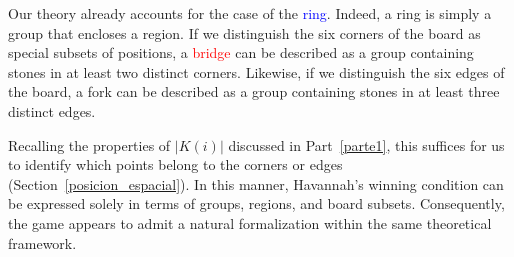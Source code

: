 	Our theory already accounts for the case of the \textcolor{Blue}{ring}. Indeed, a ring is simply a group that encloses a region. If we distinguish the six corners of the board as special subsets of positions, a \textcolor{Red}{bridge} can be described as a group containing stones in at least two distinct corners. Likewise, if we distinguish the six edges of the board, a \textcolor{OliveGreen}{fork} can be described as a group containing stones in at least three distinct edges.
	
	Recalling the properties of $|K(i)|$ discussed in Part~\ref{parte1}, this suffices for us to identify which points belong to the corners or edges (Section~\ref{posicion_espacial}). In this manner, Havannah's winning condition can be expressed solely in terms of groups, regions, and board subsets. Consequently, the game appears to admit a natural formalization within the same theoretical framework.

